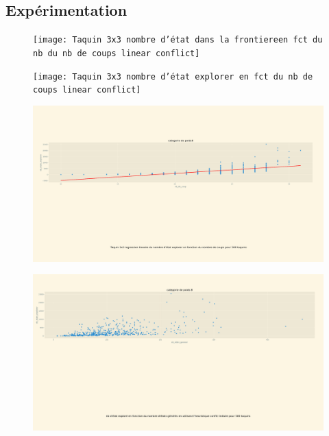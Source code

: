 \documentclass[a4paper, 12pt]{article}
\begin{document}
\subsection{Expérimentation}
\begin{figure}[H]
    \centering
    \texttt{[image: Taquin 3x3 nombre d'état dans la frontiereen fct du nb du nb de coups linear conflict]}
\end{figure}
\begin{figure}[H]
    \centering
    \texttt{[image: Taquin 3x3 nombre d'état explorer en fct du nb de coups linear conflict]}
\end{figure}
\begin{figure}[H]
    \centering
    \includegraphics[width=\textwidth]{Taquin 3x3 nombre d'etat explorer en fct du nb de coups reg lineaire Linear conflict}
\end{figure}
\begin{figure}[H]
    \centering
    \includegraphics[width=\textwidth]{Taquin 3x3 nombre d'etat explorer en fct du nb de detat generer linear conflict}
\end{figure}
\end{document}
